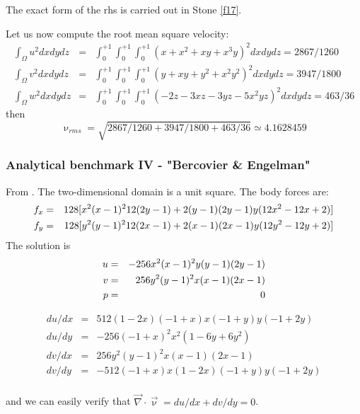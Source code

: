 The exact form of the rhs is carried out in Stone \ref{f17}.

Let us now compute the root mean square velocity:
\begin{eqnarray}
\int_\Omega u^2 dx dy dz &=& \int_{0}^{+1}\int_{0}^{+1}\int_{0}^{+1} (x+x^2+xy+x^3y )^2 dx dy dz = 2867/1260 \\
\int_\Omega v^2 dx dy dz &=& \int_{0}^{+1}\int_{0}^{+1}\int_{0}^{+1} (y + xy + y^2 + x^2 y^2 )^2 dx dy dz = 3947/1800   \\
\int_\Omega w^2 dx dy dz &=& \int_{0}^{+1}\int_{0}^{+1}\int_{0}^{+1} (-2z - 3xz - 3yz - 5x^2 yz )^2 dx dy dz = 463/36   
\end{eqnarray}
then
\[
\upnu_{rms}=\sqrt{ 2867/1260 + 3947/1800 + 463/36  } \simeq 4.1628459
\]



\subsubsection{Analytical benchmark IV \label{mms4} - "Bercovier \& Engelman"}

From \cite{been79}. The two-dimensional domain is a unit square. The body forces are:
\begin{eqnarray}
f_x &=& 128[ x^2(x-1)^2 12 (2y-1) + 2 (y-1)(2y-1)y(12x^2-12x+2)  ] \nonumber\\
f_y &=& 128[ y^2(y-1)^2 12 (2x-1) + 2 (x-1)(2x-1)y(12y^2-12y+2)  ] \nonumber\\
\end{eqnarray}
The solution is
\begin{eqnarray}
u &=& -256x^2(x-1)^2y(y-1)(2y-1) \nonumber\\
v &=&  256y^2(y-1)^2x(x-1)(2x-1) \nonumber\\
p &=& 0 
\end{eqnarray}

\begin{eqnarray}
du/dx &=& 512 (1 - 2x) (-1+x) x(-1+y) y(-1+2y) \\ 
du/dy &=& -256 (-1 + x)^2 x^2 (1 - 6 y + 6 y^2) \\ 
dv/dx &=&  256y^2(y-1)^2x(x-1)(2x-1) \\ 
dv/dy &=& -512 (-1 + x) x (1 - 2 x) (-1 + y) y (-1 + 2 y) \\
\end{eqnarray}

and we can easily verify that $\vec\nabla\cdot\vec\upnu=du/dx+dv/dy=0$.

